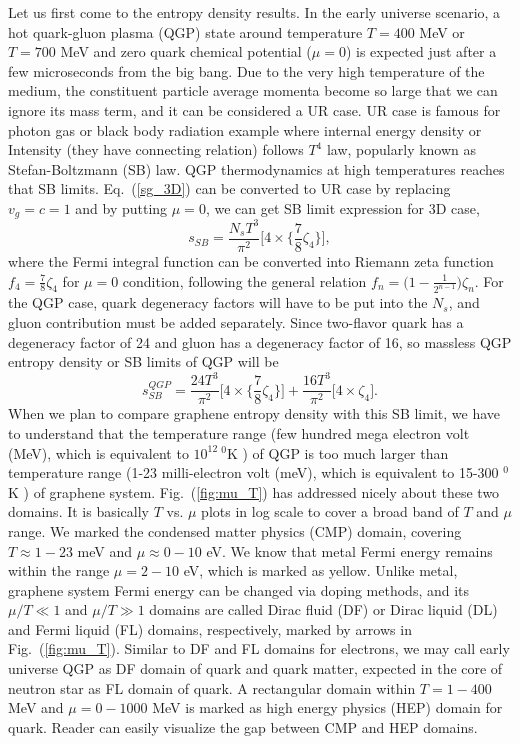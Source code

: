\documentclass[%
 reprint,
 amsmath,amssymb,
 aps,
]{revtex4-2}
\newcommand{\be}{\begin{equation}}
\newcommand{\ee}{\end{equation}}
\begin{document}
    Let us first come to the entropy density results. In the early universe scenario, a hot quark-gluon plasma (QGP) state around temperature $T=400$ MeV or $T=700$ MeV and zero quark chemical potential ($\mu=0$) is expected just after a few microseconds from the big bang. Due to the very high temperature of the medium, the constituent particle average momenta become so large that we can ignore its mass term, and it can be considered a UR case. UR case is famous for photon gas or black body radiation example where internal energy density or Intensity (they have connecting relation) follows $T^4$ law, popularly known as Stefan-Boltzmann (SB) law. QGP thermodynamics at high temperatures reaches that SB limits. Eq.~(\ref{sg_3D}) can be converted to UR case by replacing $v_g=c=1$ and by putting $\mu=0$, we can get SB limit expression for 3D case,
    \be 
    s_{SB} = \frac{N_s T^3}{\pi^2 } \Bigg[4\times \Big\{\frac{7}{8}\zeta_4\Big\} \Bigg],
    \label{sSB_3D}
    \ee 
    where the Fermi integral function can be converted into Riemann zeta function $f_4=\frac{7}{8}\zeta_4$ for $\mu=0$ condition, following the general relation $f_n=\Big(1-\frac{1}{2^{n-1}}\Big)\zeta_n$. For the QGP case, quark degeneracy factors will have to be put into the $N_s$, and gluon contribution must be added separately. Since two-flavor quark has a degeneracy factor of 24 and gluon has a degeneracy factor of 16, so massless QGP entropy density or SB limits of QGP will be 
    \be 
    s^{QGP}_{SB} = \frac{24 T^3}{\pi^2 } \Big[4\times \Big\{\frac{7}{8}\zeta_4\Big\} \Big]+\frac{16 T^3}{\pi^2 } \Big[4\times \zeta_4 \Big].
    \label{s_QGP}
    \ee 
    When we plan to compare graphene entropy density with this SB limit, we have to understand that the temperature range (few hundred mega electron volt (MeV), which is equivalent to $10^{12}~^0$K ) of QGP is too much larger than temperature range (1-23 milli-electron volt (meV), which is equivalent to 15-300 $^0$K ) of graphene system. Fig.~(\ref{fig:mu_T}) has addressed nicely about these two domains. It is basically $T$ vs. $\mu$ plots in log scale to cover a broad band of $T$ and $\mu$ range. We marked the condensed matter physics (CMP) domain, covering  $T\approx 1-23$ meV and $\mu\approx 0-10$ eV. We know that metal Fermi energy remains within the range $\mu=2-10$ eV, which is marked as yellow. Unlike metal, graphene system Fermi energy can be changed via doping methods, and its $\mu/T\ll 1$ and $\mu/T\gg 1$ domains are called Dirac fluid (DF) or Dirac liquid (DL) and Fermi liquid (FL) domains, respectively, marked by arrows in Fig.~(\ref{fig:mu_T}). Similar to DF and FL domains for electrons, we may call early universe QGP as DF domain of quark and quark matter, expected in the core of neutron star as FL domain of quark. A rectangular domain within $T=1-400$ MeV and $\mu=0-1000$ MeV is marked as high energy physics (HEP) domain for quark. Reader can easily visualize the gap between CMP and HEP domains.
\end{document}
